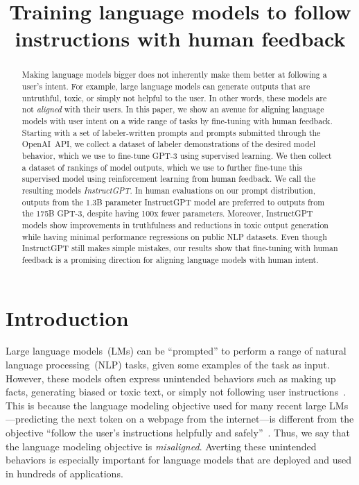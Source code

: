 \title{Training language models to follow instructions with human feedback}

\begin{abstract}
Making language models bigger does not inherently make them better at following a user's intent. For example, large language models can generate outputs that are untruthful, toxic, or simply not helpful to the user. In other words, these models are not \emph{aligned} with their users. In this paper, we show an avenue for aligning language models with user intent on a wide range of tasks by fine-tuning with human feedback. Starting with a set of labeler-written prompts and prompts submitted through the OpenAI~API, we collect a dataset of labeler demonstrations of the desired model behavior, which we use to fine-tune GPT-3 using supervised learning. We then collect a dataset of rankings of model outputs, which we use to further fine-tune this supervised model using reinforcement learning from human feedback. We call the resulting models \emph{InstructGPT}.
In human evaluations on our prompt distribution, outputs from the 1.3B parameter InstructGPT model are preferred to outputs from the 175B {GPT-3}, despite having 100x fewer parameters. Moreover, InstructGPT models show improvements in truthfulness and reductions in toxic output generation while having minimal performance regressions on public NLP datasets. Even though InstructGPT still makes simple mistakes, our results show that fine-tuning with human feedback is a promising direction for aligning language models with human intent.
\end{abstract}

\section{Introduction}
\label{sec:intro}

Large language models~(LMs) can be ``prompted'' to perform a range of natural language processing~(NLP) tasks, given some examples of the task as input. However, these models often express unintended behaviors such as making up facts, generating biased or toxic text, or simply not following user instructions~\citep{bender2021dangers,bommasani2021opportunities,kenton2021alignment,weidinger2021ethical,tamkin2021understanding,gehman2020realtoxicityprompts}. This is because the language modeling objective used for many recent large LMs---predicting the next token on a webpage from the internet---is different from the objective ``follow the user's instructions helpfully and safely''~\citep{radford2019language,brown2020language,fedus2021switch,rae2021scaling,thoppilan2022lamda}. Thus, we say that the language modeling objective is \textit{misaligned}. Averting these unintended behaviors is especially important for language models that are deployed and used in hundreds of applications.

